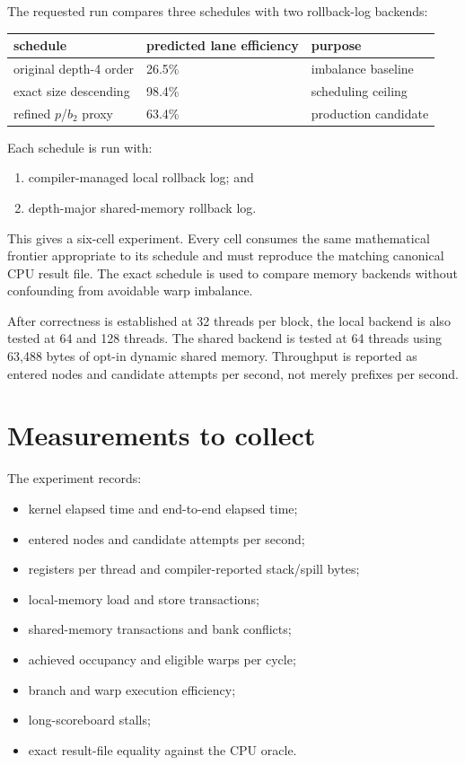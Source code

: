 \documentclass[11pt,a4paper]{article}
\begin{document}
The requested run compares three schedules with two rollback-log backends:

\begin{center}
\begin{tabular}{@{}lll@{}}
\toprule
schedule & predicted lane efficiency & purpose \\
\midrule
original depth-4 order & 26.5\% & imbalance baseline \\
exact size descending & 98.4\% & scheduling ceiling \\
refined $p$/$b_2$ proxy & 63.4\% & production candidate \\
\bottomrule
\end{tabular}
\end{center}

Each schedule is run with:

\begin{enumerate}
  \item compiler-managed local rollback log; and
  \item depth-major shared-memory rollback log.
\end{enumerate}

This gives a six-cell experiment. Every cell consumes the same mathematical frontier appropriate to its schedule and must reproduce the matching canonical CPU result file. The exact schedule is used to compare memory backends without confounding from avoidable warp imbalance.

After correctness is established at 32 threads per block, the local backend is also tested at 64 and 128 threads. The shared backend is tested at 64 threads using 63,488 bytes of opt-in dynamic shared memory. Throughput is reported as entered nodes and candidate attempts per second, not merely prefixes per second.

\section{Measurements to collect}

The experiment records:

\begin{itemize}
  \item kernel elapsed time and end-to-end elapsed time;
  \item entered nodes and candidate attempts per second;
  \item registers per thread and compiler-reported stack/spill bytes;
  \item local-memory load and store transactions;
  \item shared-memory transactions and bank conflicts;
  \item achieved occupancy and eligible warps per cycle;
  \item branch and warp execution efficiency;
  \item long-scoreboard stalls;
  \item exact result-file equality against the CPU oracle.
\end{itemize}
\end{document}
